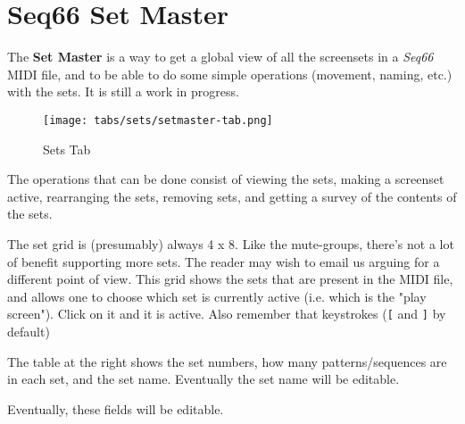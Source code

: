 %
%
%

\section{Seq66 Set Master}
\label{sec:setmaster}

   The \textbf{Set Master} is a way to get a global view of all the screensets
   in a \textsl{Seq66} MIDI file, and to be able to do some simple operations
   (movement, naming, etc.) with the sets.  It is still a work in progress.

\begin{figure}[H]
   \centering 
   \texttt{[image: tabs/sets/setmaster-tab.png]}
   \caption{Sets Tab}
   \label{fig:setmaster_tab}
\end{figure}

   The operations that can be done consist of viewing the sets, making a
   screenset active, rearranging the sets, removing sets, and getting a survey of
   the contents of the sets.

   \setcounter{ItemCounter}{0}      %

   The set grid is (presumably) always 4 x 8.  Like the mute-groups, there's not
   a lot of benefit supporting more sets.  The reader may wish to email us
   arguing for a different point of view.
   This grid shows the sets that are
   present in the MIDI file, and allows one to choose which set is currently
   active (i.e. which is the "play screen").
   Click on it and it is active.
   Also remember that keystrokes (\texttt{[} and \texttt{]} by default)
 
   The table at the right shows the set numbers, how many patterns/sequences are
   in each set, and the set name.  Eventually the set name will be editable.

   Eventually, these fields will be editable.

